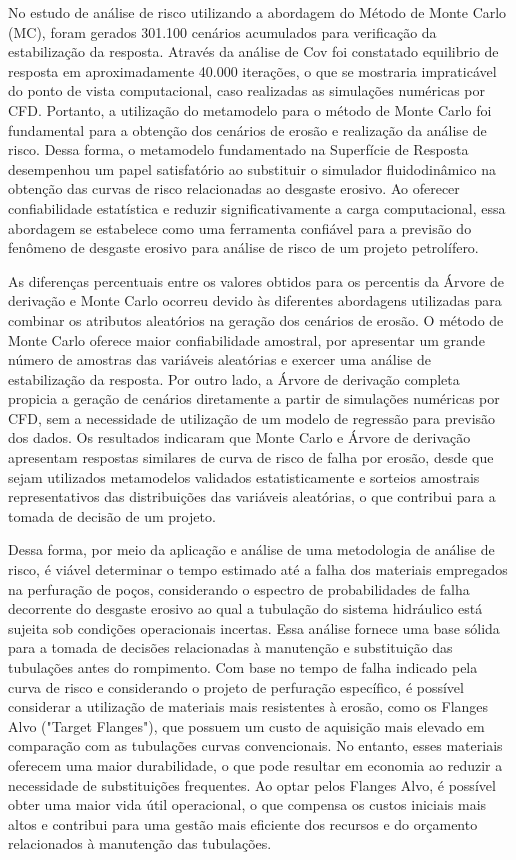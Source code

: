 No estudo de análise de risco utilizando a abordagem do Método de Monte Carlo (MC), foram gerados 301.100 cenários acumulados para verificação da estabilização da resposta. Através da análise de Cov foi constatado equilibrio de resposta em aproximadamente 40.000 iterações, o que se mostraria impraticável do ponto de vista computacional, caso realizadas as simulações numéricas por CFD. Portanto, a utilização do metamodelo para o método de Monte Carlo foi fundamental para a obtenção dos cenários de erosão e realização da análise de risco. Dessa forma, o metamodelo fundamentado na Superfície de Resposta desempenhou um papel satisfatório ao substituir o simulador fluidodinâmico na obtenção das curvas de risco relacionadas ao desgaste erosivo. Ao oferecer confiabilidade estatística e reduzir significativamente a carga computacional, essa abordagem se estabelece como uma ferramenta confiável para a previsão do fenômeno de desgaste erosivo para análise de risco de um projeto petrolífero.

As diferenças percentuais entre os valores obtidos para os percentis da Árvore de derivação e Monte Carlo ocorreu devido às diferentes abordagens utilizadas para combinar os atributos aleatórios na geração dos cenários de erosão. O método de Monte Carlo oferece maior confiabilidade amostral, por apresentar um grande número de amostras das variáveis aleatórias e exercer uma análise de estabilização da resposta. Por outro lado, a Árvore de derivação completa propicia a geração de cenários diretamente a partir de simulações numéricas por CFD, sem a necessidade de utilização de um modelo de regressão para previsão dos dados. Os resultados indicaram que Monte Carlo e Árvore de derivação apresentam respostas similares de curva de risco de falha por erosão, desde que sejam utilizados metamodelos validados estatisticamente e sorteios amostrais representativos das distribuições das variáveis aleatórias, o que contribui para a tomada de decisão de um projeto.
 
Dessa forma, por meio da aplicação e análise de uma metodologia de análise de risco, é viável determinar o tempo estimado até a falha dos materiais empregados na perfuração de poços, considerando o espectro de probabilidades de falha decorrente do desgaste erosivo ao qual a tubulação do sistema hidráulico está sujeita sob condições operacionais incertas. Essa análise fornece uma base sólida para a tomada de decisões relacionadas à manutenção e substituição das tubulações antes do rompimento. Com base no tempo de falha indicado pela curva de risco e considerando o projeto de perfuração específico, é possível considerar a utilização de materiais mais resistentes à erosão, como os Flanges Alvo ("Target Flanges"), que possuem um custo de aquisição mais elevado em comparação com as tubulações curvas convencionais. No entanto, esses materiais oferecem uma maior durabilidade, o que pode resultar em economia ao reduzir a necessidade de substituições frequentes. Ao optar pelos Flanges Alvo, é possível obter uma maior vida útil operacional, o que compensa os custos iniciais mais altos e contribui para uma gestão mais eficiente dos recursos e do orçamento relacionados à manutenção das tubulações.
 
